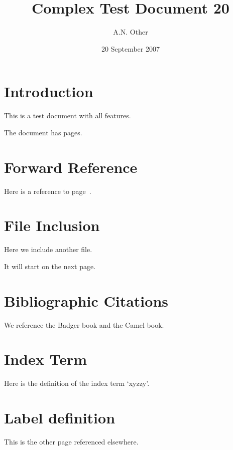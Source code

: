 \documentclass{article}
\date{20 September 2007}
\author{A.N. Other}
\title{Complex Test Document 20}
\begin{document}
\maketitle
\tableofcontents

\pagebreak
\section{Introduction}
This is a test document with all features.

The document has \pageref{LastPage} pages.

\pagebreak
\section{Forward Reference}

Here is a reference to page~\pageref{otherpage}.

\pagebreak
\section{File Inclusion}

Here we include another f{}ile.

It will start on the next page.



\pagebreak
\section{Bibliographic Citations}
We reference the Badger book\cite{wardley-ptt-2003} and the Camel book\cite{wall-perl-2000}.

\pagebreak
\section{Index Term}

Here is the def{}inition of the index term `xyzzy'.


\pagebreak
\section{Label definition}
This is the other page\label{otherpage} referenced elsewhere.


\pagebreak

\pagebreak
\printindex
\end{document}
